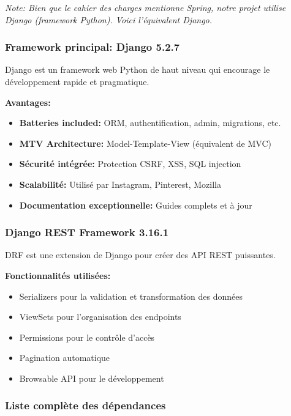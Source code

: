 \textit{Note: Bien que le cahier des charges mentionne Spring, notre projet utilise Django (framework Python). Voici l'équivalent Django.}

\subsubsection{Framework principal: Django 5.2.7}

Django est un framework web Python de haut niveau qui encourage le développement rapide et pragmatique.

\textbf{Avantages:}
\begin{itemize}
    \item \textbf{Batteries included:} ORM, authentification, admin, migrations, etc.
    \item \textbf{MTV Architecture:} Model-Template-View (équivalent de MVC)
    \item \textbf{Sécurité intégrée:} Protection CSRF, XSS, SQL injection
    \item \textbf{Scalabilité:} Utilisé par Instagram, Pinterest, Mozilla
    \item \textbf{Documentation exceptionnelle:} Guides complets et à jour
\end{itemize}

\subsubsection{Django REST Framework 3.16.1}

DRF est une extension de Django pour créer des API REST puissantes.

\textbf{Fonctionnalités utilisées:}
\begin{itemize}
    \item Serializers pour la validation et transformation des données
    \item ViewSets pour l'organisation des endpoints
    \item Permissions pour le contrôle d'accès
    \item Pagination automatique
    \item Browsable API pour le développement
\end{itemize}

\subsubsection{Liste complète des dépendances}

